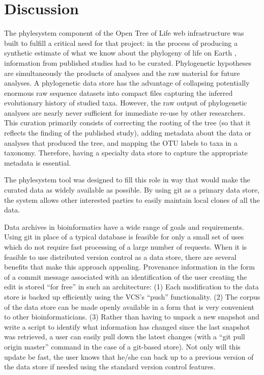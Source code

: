 \documentclass{bioinfo}
\newcommand{\ps}{phylesystem\xspace}
\newcommand{\otol}{Open Tree of Life\xspace}
\begin{document}
\section{Discussion}
The \ps component of the \otol web infrastructure was built to fulfill a critical need for that
    project: in the process of producing a synthetic estimate of what we know about the phylogeny
    of life on Earth \citep{Smith2014}, information from published studies had to be curated.
Phylogenetic hypotheses are simultaneously the products of analyses and the raw material for future analyses.
A phylogenetic data store has the advantage of collapsing potentially enormous raw sequence datasets
  into compact files capturing the inferred evolutionary history of studied taxa.
However, the raw output of phylogenetic analyses are nearly never sufficient for immediate re-use by other researchers. 
This curation primarily consists of correcting the rooting of the tree (so that it reflects the finding of the published study), adding metadata about the data
    or analyses that produced the tree, and mapping the OTU labels to taxa in a taxonomy.
Therefore, having a specialty data store to capture the appropriate metadata is essential.

The \ps tool was designed to fill this role in way that would make the curated data as widely available
    as possible.
By using git as a primary data store, the system allows other interested parties to easily maintain
    local clones of all the data.

Data archives in bioinformatics have a wide range of goals and requirements.
Using git in place of a typical database is feasible for only a small set of uses which do not require
    fast processing of a large number of requests.
When it is feasible to use distributed version control as a data store, there are several benefits
    that make this approach appealing.
Provenance information in the form of a commit message associated with an identification of the 
    user creating the edit is stored ``for free'' in such an architecture:
(1) Each modification to the data store is backed up efficiently using the VCS's ``push'' functionality.
(2) The corpus of the data store can be made openly available in a form that is very convenient to
    other bioinformaticians.
(3) Rather than having to unpack a new snapshot and write a script to identify
    what information has changed since the last snapshot was retrieved, a user can easily pull down
    the latest changes (with a ``git pull origin master'' command in the case of a git-based store).
Not only will this update be fast, the user knows that he/she can back up to a previous version of the 
    data store if needed using the standard version control features.
\end{document}
